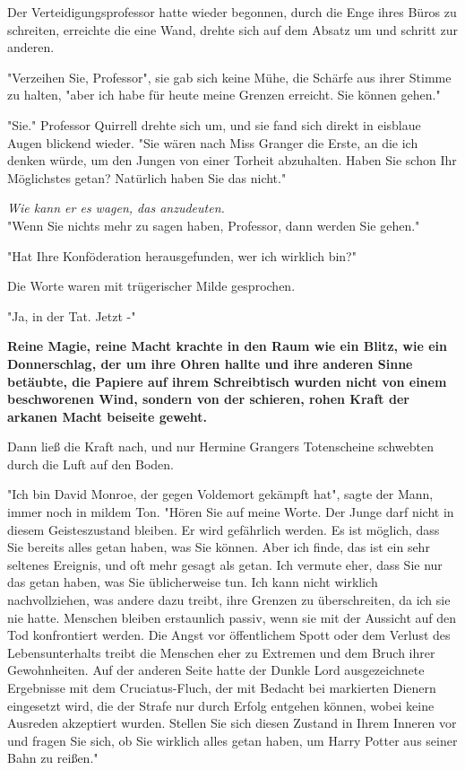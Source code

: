 {Der Verteidigungsprofessor hatte wieder begonnen, durch die Enge ihres Büros zu schreiten, erreichte die eine Wand, drehte sich auf dem Absatz um und schritt zur anderen.

"Verzeihen Sie, Professor", sie gab sich keine Mühe, die Schärfe aus ihrer Stimme zu halten, "aber ich habe für heute meine Grenzen erreicht. Sie können gehen."

"Sie." Professor Quirrell drehte sich um, und sie fand sich direkt in eisblaue Augen blickend wieder. "Sie wären nach Miss Granger die Erste, an die ich denken würde, um den Jungen von einer Torheit abzuhalten. Haben Sie schon Ihr Möglichstes getan? Natürlich haben Sie das nicht."

\emph{Wie kann er es wagen, das anzudeuten.}\\ "Wenn Sie nichts mehr zu sagen haben, Professor, dann werden Sie gehen."

"Hat Ihre Konföderation herausgefunden, wer ich wirklich bin?"

Die Worte waren mit trügerischer Milde gesprochen.

"Ja, in der Tat. Jetzt -"

\textbf{Reine Magie, reine Macht krachte in den Raum wie ein Blitz, wie ein Donnerschlag, der um ihre Ohren hallte und ihre anderen Sinne betäubte, die Papiere auf ihrem Schreibtisch wurden nicht von einem beschworenen Wind, sondern von der schieren, rohen Kraft der arkanen Macht beiseite geweht.}

Dann ließ die Kraft nach, und nur Hermine Grangers Totenscheine schwebten durch die Luft auf den Boden.

"Ich bin David Monroe, der gegen Voldemort gekämpft hat", sagte der Mann, immer noch in mildem Ton. "Hören Sie auf meine Worte. Der Junge darf nicht in diesem Geisteszustand bleiben. Er wird gefährlich werden. Es ist möglich, dass Sie bereits alles getan haben, was Sie können. Aber ich finde, das ist ein sehr seltenes Ereignis, und oft mehr gesagt als getan. Ich vermute eher, dass Sie nur das getan haben, was Sie üblicherweise tun. Ich kann nicht wirklich nachvollziehen, was andere dazu treibt, ihre Grenzen zu überschreiten, da ich sie nie hatte. Menschen bleiben erstaunlich passiv, wenn sie mit der Aussicht auf den Tod konfrontiert werden. Die Angst vor öffentlichem Spott oder dem Verlust des Lebensunterhalts treibt die Menschen eher zu Extremen und dem Bruch ihrer Gewohnheiten. Auf der anderen Seite hatte der Dunkle Lord ausgezeichnete Ergebnisse mit dem Cruciatus-Fluch, der mit Bedacht bei markierten Dienern eingesetzt wird, die der Strafe nur durch Erfolg entgehen können, wobei keine Ausreden akzeptiert wurden. Stellen Sie sich diesen Zustand in Ihrem Inneren vor und fragen Sie sich, ob Sie wirklich alles getan haben, um Harry Potter aus seiner Bahn zu reißen."

}

